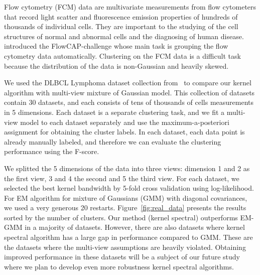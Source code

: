 
Flow cytometry (FCM) data are multivariate measurements from flow cytometers that record light scatter and fluorescence emission properties of hundreds of thousands of individual cells. They are important to the studying of the cell structures of normal and abnormal cells and the diagnosing of human disease. \citet{cytometry_nature} introduced the FlowCAP-challenge whose main task is grouping the flow cytometry data automatically. Clustering on the FCM data is a difficult task because the distribution of the data is non-Gaussian and heavily skewed. 

We used the DLBCL Lymphoma dataset collection from~\cite{cytometry_nature} to compare our kernel algorithm with multi-view mixture of Gaussian model.
This collection of datasets contain 30 datasets, and each consists of tens of thousands of cells measurements in 5 dimensions. Each dataset is a separate clustering task, and we fit a multi-view model to each dataset separately and use the maximum-a-posteriori assignment for obtaining the cluster labels.  In each dataset, each data point is already manually labeled, and therefore we can evaluate the clustering performance using the F-score.

We splitted the 5 dimensions of the data into three views: dimension 1 and 2 as the first view, 3 and 4 the second and 5 the third view. For each dataset, we selected the best kernel bandwidth by 5-fold cross validation using log-likelihood. For EM algorithm for mixture of Gaussians (GMM) with diagonal covariances, we used a very generous 20 restarts. Figure~\ref{fig:real_data} presents the results sorted by the number of clusters. Our method (kernel spectral) outperforms EM-GMM in a majority of datasets. However, there are also datasets where kernel spectral algorithm has a large gap in performance compared to GMM. These are the datasets where the multi-view assumptions are heavily violated. Obtaining improved performance in these datasets will be a subject of our future study where we plan to develop even more robustness kernel spectral algorithms.

